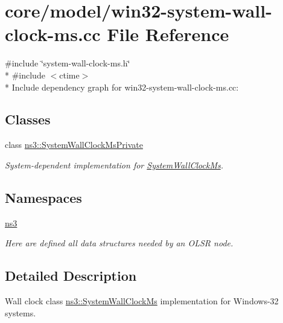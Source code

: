 \hypertarget{win32-system-wall-clock-ms_8cc}{}\section{core/model/win32-\/system-\/wall-\/clock-\/ms.cc File Reference}
\label{win32-system-wall-clock-ms_8cc}
{\ttfamily \#include \char`\"{}system-\/wall-\/clock-\/ms.\+h\char`\"{}}\\*
{\ttfamily \#include $<$ctime$>$}\\*
Include dependency graph for win32-\/system-\/wall-\/clock-\/ms.cc\+:
\subsection*{Classes}
\begin{DoxyCompactItemize}
\item 
class \hyperlink{classns3_1_1SystemWallClockMsPrivate}{ns3\+::\+System\+Wall\+Clock\+Ms\+Private}
\begin{DoxyCompactList}\small\item\em System-\/dependent implementation for \hyperlink{classns3_1_1SystemWallClockMs}{System\+Wall\+Clock\+Ms}. \end{DoxyCompactList}\end{DoxyCompactItemize}
\subsection*{Namespaces}
\begin{DoxyCompactItemize}
\item 
 \hyperlink{namespacens3}{ns3}
\begin{DoxyCompactList}\small\item\em Here are defined all data structures needed by an O\+L\+SR node. \end{DoxyCompactList}\end{DoxyCompactItemize}


\subsection{Detailed Description}
Wall clock class \hyperlink{classns3_1_1SystemWallClockMs}{ns3\+::\+System\+Wall\+Clock\+Ms} implementation for Windows-\/32 systems. 